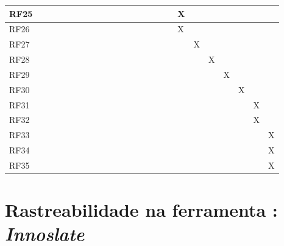 \begin{table}[H]
\begin{tabular}{|l|l|l|l|l|l|l|l|l|l|l|l|l|l|l|l|l|l|l|l|l|l|l|l|}
RF25&      &      &      &      &      &      &      &      &      &      &      &      &      &      &      &      &   X   &      &      &      &      &      &      \\ \hline
RF26&      &      &      &      &      &      &      &      &      &      &      &      &      &      &      &      &   X   &      &      &      &      &      &      \\ \hline
RF27&      &      &      &      &      &      &      &      &      &      &      &      &      &      &      &      &      &   X   &      &      &      &      &      \\ \hline
RF28&      &      &      &      &      &      &      &      &      &      &      &      &      &      &      &      &      &      &   X   &      &      &      &      \\ \hline
RF29&      &      &      &      &      &      &      &      &      &      &      &      &      &      &      &      &      &      &      &   X   &      &      &      \\ \hline
RF30&      &      &      &      &      &      &      &      &      &      &      &      &      &      &      &      &      &      &      &      &   X   &      &      \\ \hline
RF31&      &      &      &      &      &      &      &      &      &      &      &      &      &      &      &      &      &      &      &      &      &  X    &      \\ \hline
RF32&      &      &      &      &      &      &      &      &      &      &      &      &      &      &      &      &      &      &      &      &      &   X   &      \\ \hline
RF33&      &      &      &      &      &      &      &      &      &      &      &      &      &      &      &      &      &      &      &      &      &      &  X    \\ \hline
RF34&      &      &      &      &      &      &      &      &      &      &      &      &      &      &      &      &      &      &      &      &      &      &  X    \\ \hline
RF35&      &      &      &      &      &      &      &      &      &      &      &      &      &      &      &      &      &      &      &      &      &      &  X    \\ \hline
\end{tabular}
\end{table}

\section{Rastreabilidade na ferramenta : \textit{Innoslate} }

